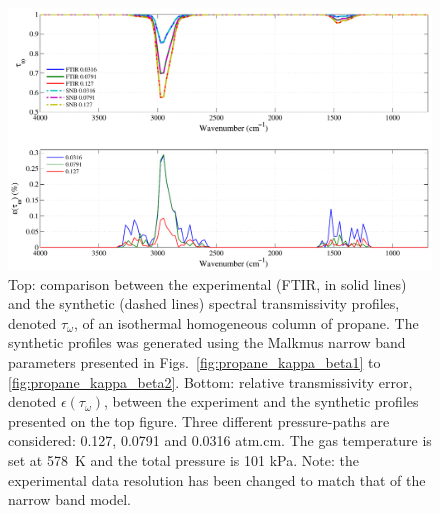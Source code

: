 \begin{figure}[p]
\includegraphics[width=\textwidth]{Figures/Comparison_Fit_Propane_MALKMUS_Temp578K.pdf}
\caption{Top: comparison between the experimental (FTIR, in solid lines) and the synthetic (dashed lines) spectral transmissivity profiles, denoted $\tau_{\omega}$, of an isothermal homogeneous column of propane. The synthetic profiles was generated using the Malkmus narrow band parameters presented in Figs.~\ref{fig:propane_kappa_beta1} to \ref{fig:propane_kappa_beta2}. Bottom: relative transmissivity error, denoted $\epsilon{(\tau_{\omega})}$, between the experiment and the synthetic profiles presented on the top figure. Three different pressure-paths are considered: 0.127, 0.0791 and 0.0316 atm.cm. The gas temperature is set at 578~K and the total pressure is 101 kPa. Note: the experimental data resolution has been changed to match that of the narrow band model. \label{fig:propane_SNBVerify_578K}}
\end{figure}

